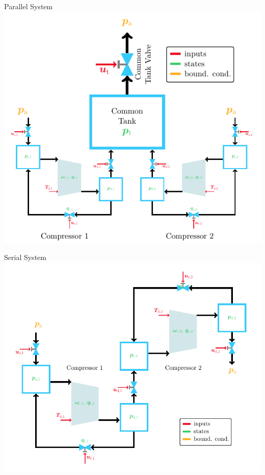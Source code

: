 \begin{frame}{Parallel System}
    \centering
    \includegraphics[width=.7\linewidth]{modelling/diagram_parallel.png}
\end{frame}

\begin{frame}{Serial System}
    \centering
    \includegraphics[width=.7\linewidth]{modelling/diagram_serial.png}
\end{frame}

